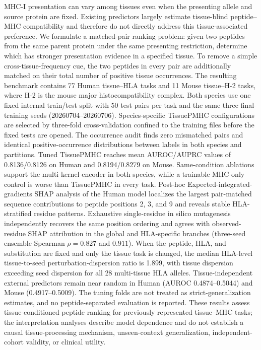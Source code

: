MHC-I presentation can vary among tissues even when the presenting allele and source protein are fixed. Existing predictors largely estimate tissue-blind peptide--MHC compatibility and therefore do not directly address this tissue-associated preference. We formulate a matched-pair ranking problem: given two peptides from the same parent protein under the same presenting restriction, determine which has stronger presentation evidence in a specified tissue. To remove a simple cross-tissue-frequency cue, the two peptides in every pair are additionally matched on their total number of positive tissue occurrences. The resulting benchmark contains 77 Human tissue--HLA tasks and 11 Mouse tissue--H-2 tasks, where H-2 is the mouse major histocompatibility complex. Both species use one fixed internal train/test split with 50 test pairs per task and the same three final-training seeds (20260704--20260706). Species-specific TissuePMHC configurations are selected by three-fold cross-validation confined to the training files before the fixed tests are opened. The occurrence audit finds zero mismatched pairs and identical positive-occurrence distributions between labels in both species and partitions. Tuned TissuePMHC reaches mean AUROC/AUPRC values of 0.8136/0.8126 on Human and 0.8194/0.8279 on Mouse. Same-condition ablations support the multi-kernel encoder in both species, while a trainable MHC-only control is worse than TissuePMHC in every task. Post-hoc Expected-integrated-gradients SHAP analysis of the Human model localizes the largest pair-matched sequence contributions to peptide positions 2, 3, and 9 and reveals stable HLA-stratified residue patterns. Exhaustive single-residue in silico mutagenesis independently recovers the same position ordering and agrees with observed-residue SHAP attribution in the global and HLA-specific branches (three-seed ensemble Spearman \(\rho=0.827\) and \(0.911\)). When the peptide, HLA, and substitution are fixed and only the tissue task is changed, the median HLA-level tissue-to-seed perturbation-dispersion ratio is 1.899, with tissue dispersion exceeding seed dispersion for all 28 multi-tissue HLA alleles. Tissue-independent external predictors remain near random in Human (AUROC 0.4874--0.5044) and Mouse (0.4917--0.5009). The tuning folds are not treated as strict-generalization estimates, and no peptide-separated evaluation is reported. These results assess tissue-conditioned peptide ranking for previously represented tissue--MHC tasks; the interpretation analyses describe model dependence and do not establish a causal tissue-processing mechanism, unseen-context generalization, independent-cohort validity, or clinical utility.
